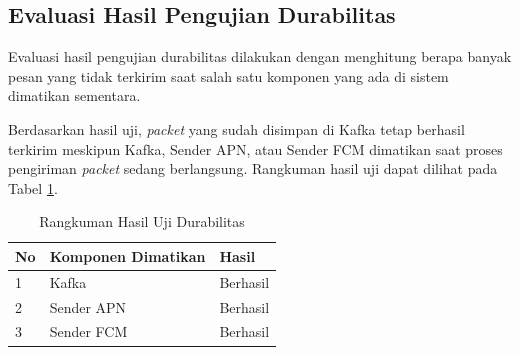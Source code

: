 \subsection{Evaluasi Hasil Pengujian Durabilitas}
\par Evaluasi hasil pengujian durabilitas dilakukan dengan menghitung berapa banyak pesan yang tidak terkirim saat salah satu komponen yang ada di sistem dimatikan sementara.
\par Berdasarkan hasil uji, \textit{packet} yang sudah disimpan di Kafka tetap berhasil terkirim meskipun Kafka, Sender APN, atau Sender FCM dimatikan saat proses pengiriman \textit{packet} sedang berlangsung. Rangkuman hasil uji dapat dilihat pada Tabel \ref{t:rangkuman-durabilitas}.
\begin{longtable}{|p{0.5cm}|p{3.5cm}|p{2cm}|}
	\caption{Rangkuman Hasil Uji Durabilitas} \label{t:rangkuman-durabilitas} \\ \hline
	\rowcolor{lightgray} No & Komponen Dimatikan & Hasil \\ \hline 
	1 & Kafka & Berhasil \\ \hline
	2 & Sender APN & Berhasil \\ \hline
	3 & Sender FCM & Berhasil \\ \hline
\end{longtable}
